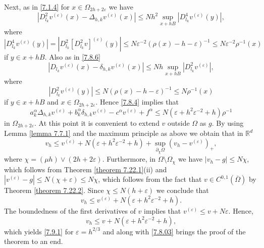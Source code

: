 \documentclass[11pt, reqno]{amsart}
\theoremstyle{definition}
\theoremstyle{remark}
\begin{document}
Next, as in \eqref{7.1.4}
for  $x\in\Omega_{2h+2\varepsilon}$ we have
$$
|D^{2}_{l_{k}}v^{(\varepsilon)}(x)-
\Delta_{h,k}v^{(\varepsilon)}(x)|\leq Nh^{2}
\sup_{x+hB}|D_{l_{k}}^{4}v^{(\varepsilon)}(y)|,
$$
where 
$$
|D_{l_{k}}^{4}v^{(\varepsilon)}(y)|=
|D_{l_{k}}^{2}[D_{l_{k}}^{2}v]^{(\varepsilon)}(y)|
\leq N\varepsilon^{-2}(\rho(x)-h-\varepsilon)^{-1}
\leq N\varepsilon^{-2} \rho^{-1}(x)
$$
if $y\in x+hB$.
Also as in \eqref{7.8.6}
$$
|D _{l_{k}}v^{(\varepsilon)}(x)-
\delta_{h,k}v^{(\varepsilon)}(x)|\leq Nh 
\sup_{x+hB}|D_{l_{k}}^{2}v^{(\varepsilon)}|,
$$
where 
$$
|D_{l_{k}}^{2}v^{(\varepsilon)}(y)| 
\leq N (\rho(x)-h-\varepsilon)^{-1}
\leq N \rho^{-1}(x) 
$$
if $y\in x+hB$ and $x\in\Omega_{2h+2\varepsilon}$.
Hence \eqref{7.8.4} implies that 
$$
 a_{k}^{\alpha} \Delta_{h,k}v^{(\varepsilon)}  
+b_{k}^{\alpha} \delta_{h,k}v^{(\varepsilon)} 
-c^{\alpha}v^{(\varepsilon)} + f^{\alpha} \leq
N(\varepsilon + h^{2}\varepsilon^{-2}  
+ h)\rho^{-1}
$$
in $\Omega_{2h+2\varepsilon}$. At this point it is convenient
to extend $v$ outside $\Omega$ as $g$. By using
  Lemma \ref{lemma 7.7.1} and the maximum principle as above we obtain that
in ${\mathbb{R}}^{d}$
$$
v_{h}\leq v^{(\varepsilon)}+
N(\varepsilon + h^{2}\varepsilon^{-2}  
+ h)+\sup_{\partial_{\chi} \Omega}(v_{h}-v^{(\varepsilon)})_{+},
$$
where $\chi=(\mu h)\vee(2h+2\varepsilon)$. Furthermore, in
$\Omega\setminus \Omega_{\chi}$ we have $|v_{h}-g|\leq N\chi$, which
follows from Theorem \ref{theorem 7.22.1}(ii) and
$|v^{(\varepsilon)}-g|\leq N(\chi+\varepsilon)\leq N\chi$,
which follows from the fact that $v\in C^{0,1}(\bar{\Omega})$
by Theorem \ref{theorem 7.22.2}. Since $\chi\leq N(h+\varepsilon)$
we conclude that
$$
v_{h}\leq v^{(\varepsilon)}+
N(\varepsilon + h^{2}\varepsilon^{-2}  
+ h).
$$
The boundedness of the first derivatives of $v$ implies that
$v^{(\varepsilon)}\leq v+N\varepsilon$. Hence,
$$
v_{h}\leq v +
N(\varepsilon + h^{2}\varepsilon^{-2}  
+ h),
$$
which yields \eqref{7.9.1} for $\varepsilon=h^{2/3}$
and along with \eqref{7.8.03} brings the proof
of the theorem to an end.

 
\end{document}
